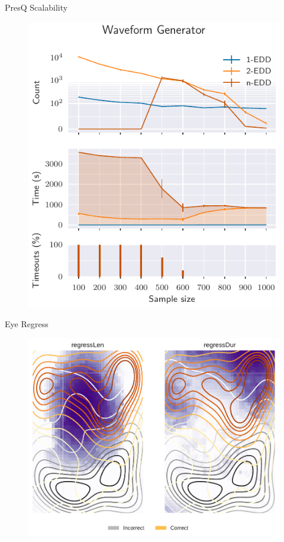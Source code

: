 \documentclass[10pt]{beamer}
\begin{document}
\begin{frame}{PresQ Scalability}
\begin{figure}
    \centering
    \includegraphics[height=\textheight]{scalability_sample_wave.pdf}
\end{figure}
\end{frame}

\begin{frame}{Eye Regress}
\begin{figure}
    \centering
    \includegraphics[height=\textheight]{eye_regress-eps-converted-to.pdf}
\end{figure}
\end{frame}
\end{document}
